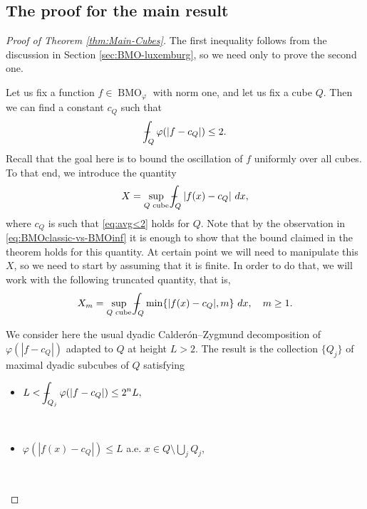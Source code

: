 \documentclass[11pt,a4paper]{amsart}
\theoremstyle{definition}
\theoremstyle{remark}
\numberwithin{equation}{section}
\DeclareMathOperator{\BMO}{BMO}
\def\Xint#1{\mathchoice
  {\XXint\displaystyle\textstyle{#1}}%
  {\XXint\textstyle\scriptstyle{#1}}%
  {\XXint\scriptstyle\scriptscriptstyle{#1}}%
  {\XXint\scriptscriptstyle\scriptscriptstyle{#1}}%
  \!\int}
\def\XXint#1#2#3{{\setbox0=\hbox{$#1{#2#3}{\int}$}
    \vcenter{\hbox{$#2#3$}}\kern-.5\wd0}}
\def\avgint{\Xint-}
\numberwithin{equation}{section}
\begin{document}
\subsection{The proof for the main result}\label{sec:concave-proof}

\begin{proof}[Proof of Theorem \ref{thm:Main-Cubes}]
The first inequality follows from the discussion in Section \ref{sec:BMO-luxemburg}, so we need only to prove the second one.

Let us fix a function $f\in \BMO_\varphi$ with norm one, and let us fix a cube $Q$. Then we can find a constant $c_Q$ such that 
%
\begin{equation}\label{eq:avg<2}
\avgint_Q \varphi(|f-c_Q|) \leq 2.
\end{equation}
%
Recall that the goal here is to bound the oscillation of $f$ uniformly over all cubes. To that end, we introduce the quantity
%
\begin{equation}\label{eq:X}
X = \sup_{Q \text{ cube} } \avgint_Q |f(x)-c_Q|\ dx,
\end{equation}
%
where $c_Q$ is such that \eqref{eq:avg<2} holds for $Q$.
Note that by the observation in \eqref{eq:BMOclassic-vs-BMOinf} it is enough to show that the bound claimed in the theorem holds for this quantity. At certain point we will need to manipulate this $X$, so we need to start by assuming  that it is finite. In order to do that, we will work with the following truncated quantity, that is,
%
\begin{equation}\label{eq:X_m}
X_m = \sup_{Q \text{ cube} } \avgint_Q \min\{|f(x)-c_Q|,m\}\ dx, \quad m\geq 1.
\end{equation}


We consider here the usual dyadic Calder\'on--Zygmund decomposition of $\varphi(|f-c_Q|)$ adapted to $Q$ at height $L>2$. The result is the collection $\{Q_j\}$ of maximal dyadic subcubes of $Q$ satisfying 
\begin{itemize}
\item $\displaystyle L< \avgint_{Q_j} \varphi(|f-c_Q|) \leq 2^n L,$

\

\item $\varphi(|f(x)-c_Q|) \leq L $ \quad a.e. $\displaystyle x\in Q \setminus \bigcup_j Q_j$,

\


\end{itemize}
\end{proof}
\end{document}
